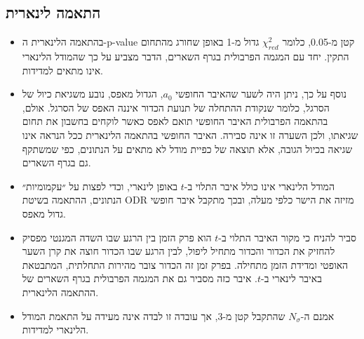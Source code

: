 \documentclass[10pt,a4paper]{article}
\newcommand{\textenglish}[1]{\foreignlanguage{english}{#1}}
\newcommand{\added}[1]{\textcolor{addedblue}{#1}}
\newcommand{\partner}[1]{\textcolor{partnergreen}{#1}}
\begin{document}
\subsection*{התאמה לינארית}
\begin{itemize}
  \item \partner{בהתאמה הלינארית ה-}\textenglish{p-value} \partner{קטן מ-0.05, כלומר} $\chi^2_{red}$ גדול מ-1 באופן \partner{שחורג מהתחום התקין}. יחד עם המגמה הפרבולית בגרף השארים, הדבר מצביע על כך שהמודל הלינארי אינו מתאים למדידות.
  \item \partner{נוסף על כך,} ניתן היה לשער שהאיבר החופשי $a_0$\partner{, הגדול מאפס,} נובע משגיאת כיול של הסרגל\partner{, כלומר שנקודת ההתחלה של תנועת הכדור איננה האפס של הסרגל}. אולם\partner{,} בהתאמה הפרבולית האיבר החופשי תואם לאפס \partner{כאשר לוקחים בחשבון את תחום שגיאתו}, ולכן השערה זו \partner{אינה סבירה}. \partner{האיבר החופשי בהתאמה הלינארית ככל הנראה} אינו שגיאה בכיול הגובה, אלא תוצאה של \partner{כפיית מודל לא מתאים על הנתונים}, כפי שמשתקף גם בגרף השארים.
  \item המודל הלינארי \partner{אינו כולל} איבר התלוי ב-$t$ באופן \partner{לינארי, וכדי} לפצות על \partner{״עקמומיות״} הנתונים, ההתאמה \added{בשיטת \textenglish{ODR}} מזיזה את הישר כלפי מעלה, ובכך מתקבל איבר חופשי גדול מאפס.
  \item \partner{סביר להניח כי} מקור האיבר התלוי ב-$t$ הוא פרק הזמן בין הרגע שבו השדה המגנטי מפסיק להחזיק את הכדור והכדור מתחיל ליפול, לבין הרגע שבו הכדור חוצה את קרן השער האופטי ומדידת הזמן מתחילה. בפרק זמן זה הכדור צובר מהירות התחלתית, המתבטאת באיבר לינארי ב-$t$. איבר כזה מסביר גם את המגמה הפרבולית בגרף השארים של ההתאמה הלינארית.
  \item \partner{אמנם ה-}$N_\sigma$ \partner{שהתקבל קטן מ-3}, אך עובדה זו לבדה אינה מעידה על התאמת המודל הלינארי למדידות.
\end{itemize}

\end{document}
